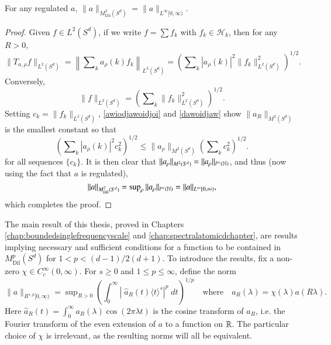 \begin{lemma} \label{L2M2Lemma}
  For any regulated $a$, $\| a \|_{M^2_{\text{Dil}}(S^d)} = \| a \|_{L^\infty[0,\infty)}$.
\end{lemma}
\begin{proof}
  Given $f \in L^2(S^d)$, if we write $f = \sum f_k$ with $f_k \in \mathcal{H}_k$, then for any $R > 0$,
  \begin{equation} \label{awiodjawoidjoi}
    \| T_{a,\rho} f \|_{L^2(S^d)} = \left\| \sum\nolimits_k a_\rho(k) f_k \right\|_{L^2(S^d)} = \left( \sum\nolimits_k |a_\rho(k)|^2 \| f_k \|_{L^2(S^d)}^2 \right)^{1/2}.
  \end{equation}
  Conversely,
  \begin{equation} \label{dawoidjaw}
    \| f \|_{L^2(S^d)} = \left( \sum\nolimits_k \| f_k \|_{L^2(S^d)}^2 \right)^{1/2}.
  \end{equation}
  Setting $c_k = \| f_k \|_{L^2(S^d)}$, \eqref{awiodjawoidjoi} and \eqref{dawoidjaw} show $\| a_R \|_{M^2(S^d)}$ is the smallest constant so that
  \begin{equation}
    \left( \sum\nolimits_k |a_\rho(k)|^2 c_k^2 \right)^{1/2} \leq \| a_\rho \|_{M^2(S^d)} \left( \sum\nolimits_k c_k^2 \right)^{1/2}.
  \end{equation}
  for all sequences $\{ c_k \}$. It is then clear that $\| a_\rho \|_{M^2(S^d)} = \| a_\rho \|_{l^\infty(\operatorname{\mathbb{N}})}$, and thus (now using the fact that $a$ is regulated),
  \begin{equation}
    \| a \|_{M^2_{\text{Dil}}(S^d)} = \sup\nolimits_\rho \| a_\rho \|_{l^\infty(\operatorname{\mathbb{N}})} = \| a \|_{L^\infty[0,\infty)},
  \end{equation}
  which completes the proof.
\end{proof}

The main result of this thesis, proved in Chapters \ref{chap:boundedsinglefrequencyscale} and \ref{chap:spectralatomicdchapter}, are results implying necessary and sufficient conditions for a function to be contained in $M^p_{\text{Dil}}(S^d)$ for $1 < p < (d-1)/2(d+1)$. To introduce the results, fix a non-zero $\chi \in C_c^\infty(0,\infty)$. For $s \geq 0$ and $1 \leq p \leq \infty$, define the norm
%
\begin{equation}
  \| a \|_{R^{s,p}[0,\infty)} = \sup\nolimits_{R > 0} \left( \int_0^\infty \left|\;\! \widehat{a}_R(t) \langle t \rangle^s \right|^p\; dt \right)^{1/p} \quad\text{where}\quad a_R(\lambda) = \chi(\lambda) a(R \lambda).
\end{equation}
%
Here $\widehat{a}_R(t) = \int_0^\infty a_R(\lambda) \cos(2 \pi \lambda t)$ is the cosine transform of $a_R$, i.e. the Fourier transform of the even extension of $a$ to a function on $\operatorname{\mathbb{R}}$. The particular choice of $\chi$ is irrelevant, as the resulting norms will all be equivalent. %


